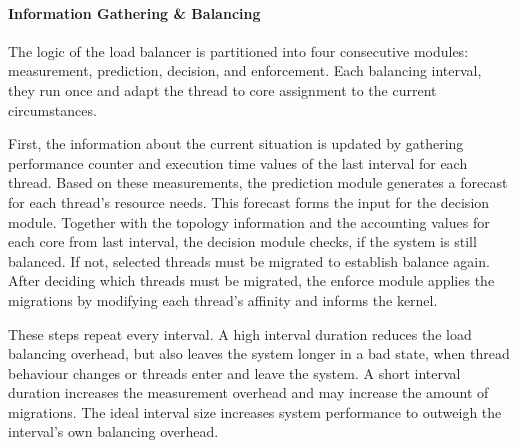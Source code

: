 \paragraph{Information Gathering \& Balancing}
The logic of the load balancer is partitioned into four consecutive modules:
measurement, prediction, decision, and enforcement.
Each balancing interval, they run once and adapt the thread to core
assignment to the current circumstances.

First, the information about the current situation is updated by gathering
performance counter and execution time values of the last interval for each
thread.
Based on these measurements, the prediction module generates a forecast for
each thread's resource needs.
This forecast forms the input for the decision module.
Together with the topology information and the accounting values for each core
from last interval, the decision module checks, if the system is still balanced.
If not, selected threads must be migrated to establish balance again.
After deciding which threads must be migrated, the enforce module applies the
migrations by modifying each thread's affinity and informs the kernel.

These steps repeat every interval. A high interval duration reduces the
load balancing overhead, but also leaves the system longer in a bad state, when
thread behaviour changes or threads enter and leave the system.
A short interval duration increases the measurement overhead and may increase
the amount of migrations.
The ideal interval size increases system performance to outweigh the interval's
own balancing overhead.


